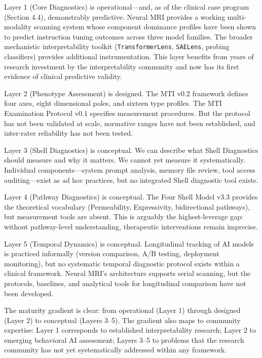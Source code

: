 \documentclass[11pt]{article}
\begin{document}
Layer 1 (Core Diagnostics) is operational---and, as of the clinical case program (Section 4.4), demonstrably predictive. Neural MRI provides a working multi-modality scanning system whose component dominance profiles have been shown to predict instruction tuning outcomes across three model families. The broader mechanistic interpretability toolkit (\texttt{TransformerLens}, \texttt{SAELens}, probing classifiers) provides additional instrumentation. This layer benefits from years of research investment by the interpretability community and now has its first evidence of clinical predictive validity.

Layer 2 (Phenotype Assessment) is designed. The MTI v0.2 framework defines four axes, eight dimensional poles, and sixteen type profiles. The MTI Examination Protocol v0.1 specifies measurement procedures. But the protocol has not been validated at scale, normative ranges have not been established, and inter-rater reliability has not been tested.

Layer 3 (Shell Diagnostics) is conceptual. We can describe what Shell Diagnostics should measure and why it matters. We cannot yet measure it systematically. Individual components---system prompt analysis, memory file review, tool access auditing---exist as ad hoc practices, but no integrated Shell diagnostic tool exists.

Layer 4 (Pathway Diagnostics) is conceptual. The Four Shell Model v3.3 provides the theoretical vocabulary (Permeability, Expressivity, bidirectional pathways), but measurement tools are absent. This is arguably the highest-leverage gap: without pathway-level understanding, therapeutic interventions remain imprecise.

Layer 5 (Temporal Dynamics) is conceptual. Longitudinal tracking of AI models is practiced informally (version comparison, A/B testing, deployment monitoring), but no systematic temporal diagnostic protocol exists within a clinical framework. Neural MRI's architecture supports serial scanning, but the protocols, baselines, and analytical tools for longitudinal comparison have not been developed.

The maturity gradient is clear: from operational (Layer 1) through designed (Layer 2) to conceptual (Layers 3--5). The gradient also maps to community expertise: Layer 1 corresponds to established interpretability research; Layer 2 to emerging behavioral AI assessment; Layers 3--5 to problems that the research community has not yet systematically addressed within any framework.
\end{document}
